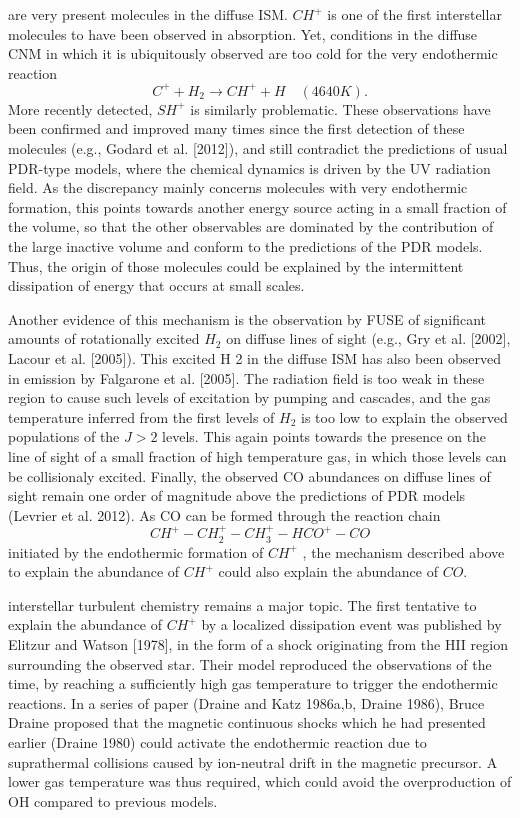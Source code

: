  are very present molecules in the diffuse ISM. $CH^+$ is one of the first interstellar molecules to have been observed in absorption. Yet, conditions in the diffuse CNM in which it is ubiquitously observed
are too cold for the very endothermic reaction 
$$C^+ + H_2 \rightarrow CH^+ + H\quad (4640 K).$$
More recently detected, $SH^+$ is similarly problematic. These observations
have been confirmed and improved many times since the first detection of
these molecules (e.g., Godard et al. [2012]), and still contradict the predictions
of usual PDR-type models, where the chemical dynamics is driven by the UV
radiation field. As the discrepancy mainly concerns molecules with very endothermic formation, this points towards another energy source acting in a
small fraction of the volume, so that the other observables are dominated by
the contribution of the large inactive volume and conform to the predictions
of the PDR models. Thus, the origin of those molecules could be explained
by the intermittent dissipation of energy that occurs at small scales.

Another evidence of this mechanism is the observation by FUSE of significant amounts of rotationally excited $H_2$ on diffuse lines of sight (e.g., Gry
et al. [2002], Lacour et al. [2005]). This excited H 2 in the diffuse ISM has also been observed in emission by Falgarone et al. [2005]. The radiation field
is too weak in these region to cause such levels of excitation by pumping
and cascades, and the gas temperature inferred from the first levels of $H_2$ is
too low to explain the observed populations of the $J > 2$ levels. This again
points towards the presence on the line of sight of a small fraction of high
temperature gas, in which those levels can be collisionaly excited.
Finally, the observed CO abundances on diffuse lines of sight remain one
order of magnitude above the predictions of PDR models (Levrier et al. 2012).
As CO can be formed through the reaction chain 
$$CH^+ - CH_2^+ - CH_3^+ - HCO^+ - CO $$
initiated by the endothermic formation of $CH^+$ , the mechanism described
above to explain the abundance of $CH^+$ could also explain the abundance of
$CO$.

interstellar turbulent chemistry remains a major topic. 
The first tentative to explain the abundance of $CH^+$ by a localized dissipation
event was published by Elitzur and Watson [1978], in the form of a shock
originating from the HII region surrounding the observed star. Their model
reproduced the observations of the time, by reaching a sufficiently high gas
temperature to trigger the endothermic reactions.
In a series of paper (Draine and Katz 1986a,b, Draine 1986), Bruce Draine
proposed that the magnetic continuous shocks which he had presented earlier (Draine 1980) could activate the endothermic reaction due to suprathermal collisions caused by ion-neutral drift in the magnetic precursor. A lower
gas temperature was thus required, which could avoid the overproduction of
OH compared to previous models.

